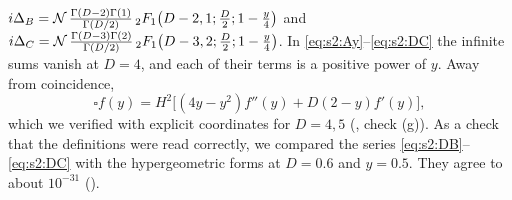 \documentclass[aps,prd,onecolumn,10pt,nofootinbib,floatfix]{revtex4-2}
\begin{document}
$i\Delta_B=\mathcal N\,\frac{\Gamma(D-2)\Gamma(1)}{\Gamma(D/2)}\,{}_2F_1\big(D-2,1;\tfrac D2;1-\tfrac y4\big)$
and
$i\Delta_C=\mathcal N\,\frac{\Gamma(D-3)\Gamma(2)}{\Gamma(D/2)}\,{}_2F_1\big(D-3,2;\tfrac D2;1-\tfrac y4\big)$.
In \eqref{eq:s2:Ay}--\eqref{eq:s2:DC} the infinite sums vanish at $D=4$, and
each of their terms is a positive power of $y$. Away from coincidence,
\begin{equation}
\square f(y)=H^2\Big[(4y-y^2)f''(y)+D(2-y)f'(y)\Big],
\label{eq:s2:boxy}
\end{equation}
which we verified with explicit coordinates for $D=4,5$
(, check (g)). As a check
that the definitions were read correctly, we compared the series
\eqref{eq:s2:DB}--\eqref{eq:s2:DC} with the hypergeometric forms at $D=0.6$
and $y=0.5$. They agree to about $10^{-31}$
().
\end{document}
